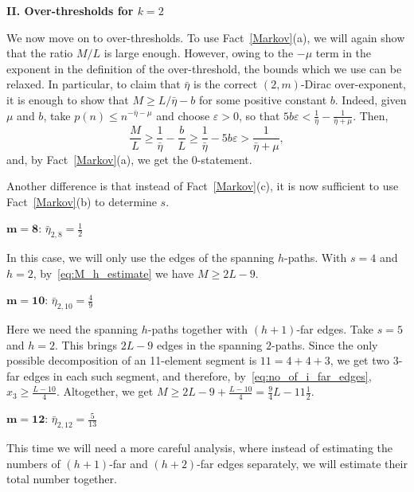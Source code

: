 \documentclass[reqno, 12pt]{amsart}
\numberwithin{equation}{section}
\numberwithin{figure}{section}
\let\epsilon=\varepsilon
\let\eps=\epsilon
\theoremstyle{plain}
\theoremstyle{definition}
\begin{document}
\medskip

{\bf II. Over-thresholds for $k=2$}

\medskip

We now move on to over-thresholds. To use Fact~\ref{Markov}(a), we will again show that the ratio $M/L$ is large enough. However, owing to the $-\mu$ term in the exponent in the definition of the over-threshold, the bounds which we use can be relaxed. In particular, to claim that $\bar\eta$ is the correct $(2,m)$-Dirac over-exponent, it is enough to show that
   $ M \geq L/\bar{\eta} - b$
for some positive constant $b$. Indeed, given $\mu$ and $b$, take $p(n) \leq n^{-\bar{\eta}-\mu}$ and choose $\eps>0$, so that
 $5b\eps <\frac1{\bar\eta}-\frac1{\bar\eta+\mu}$.     %
 Then,
 $$\frac ML\ge \frac1{\bar\eta}-\frac bL\ge \frac1{\bar\eta}-5b\eps>\frac1{\bar\eta+\mu},$$
 and, by Fact~\ref{Markov}(a), we get the 0-statement.

Another difference is that instead of Fact~\ref{Markov}(c), it is now sufficient to use Fact~\ref{Markov}(b) to determine $s$.

\medskip

$\mathbf{m=8}$: $\bar\eta_{2,8}= \frac12$

\medskip

In this case, we will only use the edges of the spanning $h$-paths. With $s=4$ and $h=2$, by~\eqref{eq:M_h_estimate} we have
$M\ge 2L-9$.

\medskip
	
$\mathbf{m=10}$: $\bar \eta_{2,10}=\frac49$

\medskip

Here we need the spanning $h$-paths together with $(h+1)$-far edges. Take $s=5$ and $h=2$. This brings $2L - 9$ edges in the spanning $2$-paths. Since the only possible decomposition of an 11-element segment is $11 = 4+4+3$, we get two 3-far edges in each such segment, and therefore, by~\eqref{eq:no_of_i_far_edges}, $x_3 \geq \frac{L-10}{4}$. Altogether, we get $M \geq 2L - 9 + \frac{L-10}{4} = \frac94L - 11\frac12$.

\medskip

$\mathbf{m=12}$: $\bar \eta_{2,12}=\frac5{13}$

\medskip

 This time we will need a more careful analysis, where instead of estimating the numbers of $(h+1)$-far and $(h+2)$-far edges separately, we will estimate their total number together.
\end{document}
